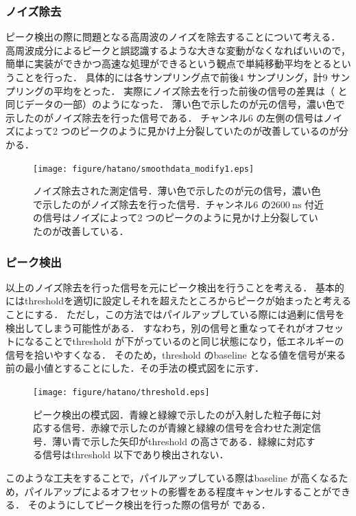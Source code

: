 \subsubsection{ノイズ除去}
ピーク検出の際に問題となる高周波のノイズを除去することについて考える．
高周波成分によるピークと誤認識するような大きな変動がなくなればいいので，簡単に実装ができかつ高速な処理ができるという観点で単純移動平均をとるということを行った．
具体的には各サンプリング点で前後4 サンプリング，計9 サンプリングの平均をとった．
実際にノイズ除去を行った前後の信号の差異は（ と同じデータの一部）のようになった．
薄い色で示したのが元の信号，濃い色で示したのがノイズ除去を行った信号である．
チャンネル6 の左側の信号はノイズによって2 つのピークのように見かけ上分裂していたのが改善しているのが分かる．

\begin{figure}[hbt]
\centering
\texttt{[image: figure/hatano/smoothdata\_modify1.eps]}
\caption{ノイズ除去された測定信号．薄い色で示したのが元の信号，濃い色で示したのがノイズ除去を行った信号．チャンネル6 の$2600~\mathrm{ns}$ 付近の信号はノイズによって2 つのピークのように見かけ上分裂していたのが改善している．}
\label{hatano_fig:smoothdata}
\end{figure}

\subsubsection{ピーク検出}
以上のノイズ除去を行った信号を元にピーク検出を行うことを考える．
基本的にはthresholdを適切に設定しそれを超えたところからピークが始まったと考えることにする．
ただし，この方法ではパイルアップしている際には過剰に信号を検出してしまう可能性がある．
すなわち，別の信号と重なってそれがオフセットになることでthreshold が下がっているのと同じ状態になり，低エネルギーの信号を拾いやすくなる．
そのため，threshold のbaseline となる値を信号が来る前の最小値とすることにした．その手法の模式図をに示す．

\begin{figure}[hbt]
\centering
\texttt{[image: figure/hatano/threshold.eps]}
\caption{ピーク検出の模式図．青線と緑線で示したのが入射した粒子毎に対応する信号．赤線で示したのが青線と緑線の信号を合わせた測定信号．薄い青で示した矢印がthreshold の高さである．緑線に対応する信号はthreshold 以下であり検出されない．}
\label{hatano_fig:threshold}
\end{figure}

このような工夫をすることで，パイルアップしている際はbaseline が高くなるため，パイルアップによるオフセットの影響をある程度キャンセルすることができる．
そのようにしてピーク検出を行った際の信号が である．

